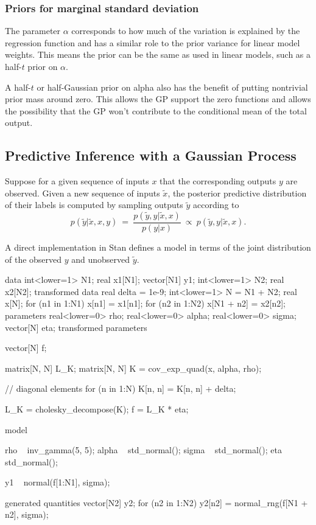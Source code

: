 \subsubsection{Priors for marginal standard deviation}

The parameter $\alpha$ corresponds to how much of the variation is
explained by the regression function and has a similar role to the
prior variance for linear model weights.  This means the prior can be
the same as used in linear models, such as a half-$t$ prior on $\alpha$.

A half-$t$ or half-Gaussian prior on alpha also has the benefit of putting
nontrivial prior mass around zero. This allows the GP support the zero
functions and allows the possibility that the GP won't contribute to the
conditional mean of the total output.

\subsection{Predictive Inference with a Gaussian Process}

Suppose for a given sequence of inputs $x$ that the corresponding
outputs $y$ are observed.  Given a new sequence of inputs $\tilde{x}$,
the posterior predictive distribution of their labels is computed by
sampling outputs $\tilde{y}$ according to
\[
p(\tilde{y}|\tilde{x},x,y)
\ = \
\frac{p(\tilde{y}, y|\tilde{x},x)}
     {p(y|x)}
\ \propto \
p(\tilde{y}, y|\tilde{x},x).
\]

A direct implementation in Stan defines a model in terms of the
joint distribution of the observed $y$ and unobserved $\tilde{y}$.
%
\begin{stancode}
data {
  int<lower=1> N1;
  real x1[N1];
  vector[N1] y1;
  int<lower=1> N2;
  real x2[N2];
}
transformed data {
  real delta = 1e-9;
  int<lower=1> N = N1 + N2;
  real x[N];
  for (n1 in 1:N1) x[n1] = x1[n1];
  for (n2 in 1:N2) x[N1 + n2] = x2[n2];
}
parameters {
  real<lower=0> rho;
  real<lower=0> alpha;
  real<lower=0> sigma;
  vector[N] eta;
}
transformed parameters {
  vector[N] f;
  {
    matrix[N, N] L_K;
    matrix[N, N] K = cov_exp_quad(x, alpha, rho);

    // diagonal elements
    for (n in 1:N)
      K[n, n] = K[n, n] + delta;

    L_K = cholesky_decompose(K);
    f = L_K * eta;
  }
}
model {
  rho ~ inv_gamma(5, 5);
  alpha ~ std_normal();
  sigma ~ std_normal();
  eta ~ std_normal();

  y1 ~ normal(f[1:N1], sigma);
}
generated quantities {
  vector[N2] y2;
  for (n2 in 1:N2)
    y2[n2] = normal_rng(f[N1 + n2], sigma);
}
\end{stancode}
%

